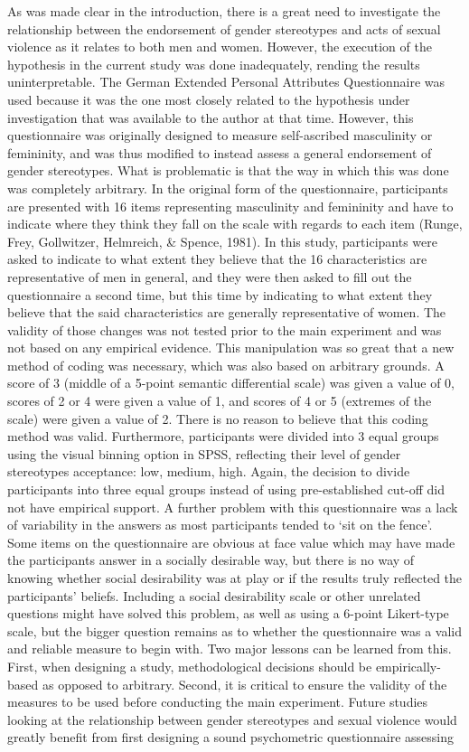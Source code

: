 \documentclass[authordate, serif, review]{jote-article}
\begin{document}
\begin{multicols}{2}
As was made clear in the introduction, there is a great need to investigate the relationship between the endorsement of gender stereotypes and acts of sexual violence as it relates to both men and women. However, the execution of the hypothesis in the current study was done inadequately, rending the results uninterpretable. The German Extended Personal Attributes Questionnaire was used because it was the one most closely related to the hypothesis under investigation that was available to the author at that time. However, this questionnaire was originally designed to measure self-ascribed masculinity or femininity, and was thus modified to instead assess a general endorsement of gender stereotypes. What is problematic is that the way in which this was done was completely arbitrary. In the original form of the questionnaire, participants are presented with 16 items representing masculinity and femininity and have to indicate where they think they fall on the scale with regards to each item (Runge, Frey, Gollwitzer, Helmreich, \& Spence, 1981). In this study, participants were asked to indicate to what extent they believe that the 16 characteristics are representative of men in general, and they were then asked to fill out the questionnaire a second time, but this time by indicating to what extent they believe that the said characteristics are generally representative of women. The validity of those changes was not tested prior to the main experiment and was not based on any empirical evidence. This manipulation was so great that a new method of coding was necessary, which was also based on arbitrary grounds. A score of 3 (middle of a 5-point semantic differential scale) was given a value of 0, scores of 2 or 4 were given a value of 1, and scores of 4 or 5 (extremes of the scale) were given a value of 2. There is no reason to believe that this coding method was valid. Furthermore, participants were divided into 3 equal groups using the visual binning option in SPSS, reflecting their level of gender stereotypes acceptance: low, medium, high. Again, the decision to divide participants into three equal groups instead of using pre-established cut-off did not have empirical support. A further problem with this questionnaire was a lack of variability in the answers as most participants tended to `sit on the fence'. Some items on the questionnaire are obvious at face value which may have made the participants answer in a socially desirable way, but there is no way of knowing whether social desirability was at play or if the results truly reflected the participants' beliefs. Including a social desirability scale or other unrelated questions might have solved this problem, as well as using a 6-point Likert-type scale, but the bigger question remains as to whether the questionnaire was a valid and reliable measure to begin with. Two major lessons can be learned from this. First, when designing a study, methodological decisions should be empirically-based as opposed to arbitrary. Second, it is critical to ensure the validity of the measures to be used before conducting the main experiment. Future studies looking at the relationship between gender stereotypes and sexual violence would greatly benefit from first designing a sound psychometric questionnaire assessing 
\end{multicols}
\end{document}
